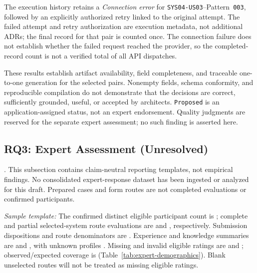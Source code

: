 The execution history retains a \emph{Connection error} for
\texttt{SYS04-US03}--Pattern~\texttt{003}, followed by an explicitly
authorized retry linked to the original attempt. The failed attempt and
retry authorization are execution metadata, not additional ADRs;
the final record for that pair is counted once. The connection failure
does not establish whether the failed request reached the provider, so
the completed-record count is not a verified total of all API dispatches.

These results establish artifact availability, field completeness, and
traceable one-to-one generation for the selected pairs. Nonempty fields,
schema conformity, and reproducible compilation do not demonstrate that
the decisions are correct, sufficiently grounded, useful, or accepted by
architects. \texttt{Proposed} is an application-assigned status, not an
expert endorsement. Quality judgments are reserved for the separate
expert assessment; no such finding is asserted here.

\subsection{RQ3: Expert Assessment (Unresolved)}
\label{sec:rq3-results}

\noindent\ExpertResultsUnresolved{}. This subsection contains
claim-neutral reporting templates, not empirical findings.
No consolidated expert-response dataset has been ingested or analyzed
for this draft. Prepared cases and form routes are not completed
evaluations or confirmed participants.




\emph{Sample template:} The confirmed distinct eligible participant
count is \ExpertParticipantCountTBD{}; complete and partial selected-system
route evaluations are \ExpertCompletedSystemEvaluationsTBD{} and
\ExpertPartialSystemEvaluationsTBD{}, respectively.
Submission dispositions and route denominators are
\ExpertSubmissionDispositionTBD{}.
Experience and knowledge summaries are \ExpertExperienceTBD{} and
\ExpertKnowledgeTBD{}, with unknown profiles \ExpertUnknownProfilesTBD{}.
Missing and invalid eligible ratings are \ExpertMissingResponsesTBD{} and
\ExpertInvalidResponsesTBD{}; observed/expected coverage is
\ExpertCoverageTBD{} (Table~\ref{tab:expert-demographics}).
Blank unselected routes will not be treated as missing eligible ratings.

